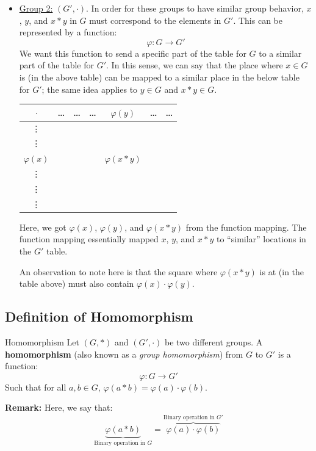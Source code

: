 \documentclass[letterpaper]{article}
\begin{document}
\begin{itemize}
    \item \underline{Group 2:} $(G', \cdot)$. In order for these groups to have similar group behavior, $x$, $y$, and $x * y$ in $G$ must correspond to the elements in $G'$. This can be represented by a function: 
    \[\varphi: G \to G'\]
    We want this function to send a specific part of the table for $G$ to a similar part of the table for $G'$. In this sense, we can say that the place where $x \in G$ is (in the above table) can be mapped to a similar place in the below table for $G'$; the same idea applies to $y \in G$ and $x * y \in G$.  
    \begin{center}
        \begin{tabular}{|c|c c c|c|c c|}
            \hline 
            $\cdot$   & \dots & \dots & \dots & $\varphi(y)$      & \dots & \dots \\ 
            \hline 
            \vdots    &       &       &       &                &       &        \\ 
            \vdots    &       &       &       &                &       &        \\ 
            \hline 
            $\varphi(x)$ &       &       &       & $\varphi(x * y)$  &       &        \\ 
            \hline 
            \vdots    &       &       &       &                &       &        \\ 
            \vdots    &       &       &       &                &       &        \\ 
            \vdots    &       &       &       &                &       &        \\ 
            \hline 
        \end{tabular}
    \end{center}
    Here, we got $\varphi(x)$, $\varphi(y)$, and $\varphi(x * y)$ from the function mapping. The function mapping essentially mapped $x$, $y$, and $x * y$ to ``similar'' locations in the $G'$ table. 

    \bigskip 

    An observation to note here is that the square where $\varphi(x * y)$ is at (in the table above) must also contain $\varphi(x) \cdot \varphi(y)$. 
\end{itemize}




\subsection{Definition of Homomorphism}
\begin{definition}{Homomorphism}{}
    Let $(G, *)$ and $(G', \cdot)$ be two different groups. A \textbf{homomorphism} (also known as a \emph{group homomorphism}) from $G$ to $G'$ is a function: 
    \[\varphi: G \to G'\]
    Such that for all $a, b \in G$, $\varphi(a * b) = \varphi(a) \cdot \varphi(b)$. 
\end{definition}
\textbf{Remark:} Here, we say that: 
\[\underbrace{\varphi(a * b)}_{\text{Binary operation in } G} = \overbrace{\varphi(a) \cdot \varphi(b)}^{\text{Binary operation in } G'}\]
\end{document}
